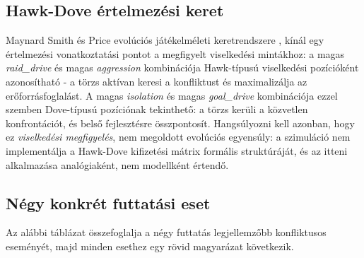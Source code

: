 \subsection*{Hawk-Dove értelmezési keret}

Maynard Smith és Price evolúciós játékelméleti keretrendszere \cite{maynardsmithprice1973},
\cite{maynardsmith1982} kínál egy értelmezési vonatkoztatási pontot a megfigyelt
viselkedési mintákhoz: a magas \textit{raid\_drive} és magas \textit{aggression}
kombinációja Hawk-típusú viselkedési pozícióként azonosítható - a törzs aktívan keresi
a konfliktust és maximalizálja az erőforrásfoglalást. A magas \textit{isolation} és magas
\textit{goal\_drive} kombinációja ezzel szemben Dove-típusú pozíciónak tekinthető:
a törzs kerüli a közvetlen konfrontációt, és belső fejlesztésre összpontosít.
Hangsúlyozni kell azonban, hogy ez \textit{viselkedési megfigyelés}, nem megoldott
evolúciós egyensúly: a szimuláció nem implementálja a Hawk-Dove kifizetési mátrix
formális struktúráját, és az itteni alkalmazása analógiaként, nem modellként értendő.

\subsection*{Négy konkrét futtatási eset}

Az alábbi táblázat összefoglalja a négy futtatás legjellemzőbb konfliktusos eseményét,
majd minden esethez egy rövid magyarázat következik.

\begin{table}[h]
  \centering
  \small
  \caption{Konfliktusos struktúra-típusok a négy futtatásban.}
  \label{tab:neurosim-conflict-cases}
\end{table}

